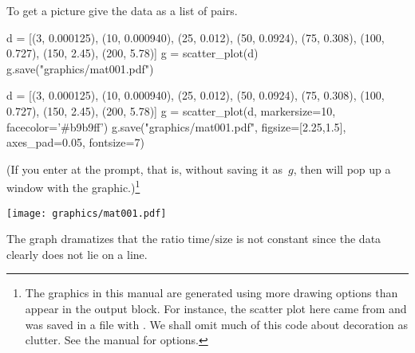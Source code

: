 To get a picture give \Sage{} the data as a list of pairs.
\begin{sageoutput}
d = [(3, 0.000125), (10, 0.000940), (25, 0.012),  
     (50, 0.0924), (75, 0.308), (100, 0.727), 
     (150, 2.45), (200, 5.78)]
g = scatter_plot(d)  
g.save("graphics/mat001.pdf")            
\end{sageoutput}
\begin{sagesilent}
d = [(3, 0.000125), (10, 0.000940), (25, 0.012),  
     (50, 0.0924), (75, 0.308), (100, 0.727), 
     (150, 2.45), (200, 5.78)]
g = scatter_plot(d, markersize=10, facecolor='#b9b9ff')
g.save("graphics/mat001.pdf", figsize=[2.25,1.5], axes_pad=0.05, fontsize=7)
\end{sagesilent}
\noindent
(If you enter  at the prompt, that is, 
without saving it as~$g$, then \Sage{} will pop up a window with the
graphic.)\footnote{The graphics in this manual are generated using 
more drawing options than appear in the output block.
For instance, the scatter plot here came from
\protect{}
and was saved in a file with
\protect{}.
We shall omit much of this code about decoration as clutter.
See the \protect\Sage{} manual for \protect{} options.}
\begin{center}
  \texttt{[image: graphics/mat001.pdf]}
\end{center}
The graph dramatizes that the ratio $\text{time}/\text{size}$
is not constant
since the data clearly does not lie on a line.

